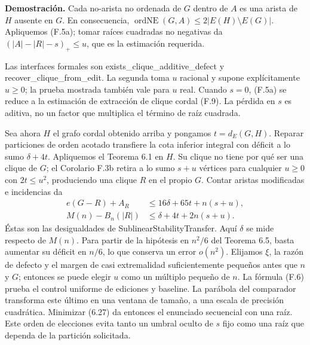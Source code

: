 \documentclass[spanish,11pt,a4paper]{article}
\begin{document}
\textbf{Demostración.} Cada no-arista no ordenada de \(G\) dentro de \(A\) es una arista de \(H\) ausente en \(G\). En consecuencia, \(\operatorname{ordNE}(G,A)\le2|E(H)\setminus E(G)|\). Apliquemos (F.5a); tomar raíces cuadradas no negativas da \((|A|-|R|-s)_+\le u\), que es la estimación requerida.

Las interfaces formales son {\ttfamily\small exists\_\discretionary{\hbox{\ensuremath{\hookrightarrow}}}{}{}clique\_\discretionary{\hbox{\ensuremath{\hookrightarrow}}}{}{}additive\_\discretionary{\hbox{\ensuremath{\hookrightarrow}}}{}{}defect} y {\ttfamily\small recover\_\discretionary{\hbox{\ensuremath{\hookrightarrow}}}{}{}clique\_\discretionary{\hbox{\ensuremath{\hookrightarrow}}}{}{}from\_\discretionary{\hbox{\ensuremath{\hookrightarrow}}}{}{}edit}. La segunda toma \(u\) racional y supone explícitamente \(u\ge0\); la prueba mostrada también vale para \(u\) real. Cuando \(s=0\), (F.5a) se reduce a la estimación de extracción de clique cordal (F.9). La pérdida en \(s\) es aditiva, no un factor que multiplica el término de raíz cuadrada.

Sea ahora \(H\) el grafo cordal obtenido arriba y pongamos \(t=d_E(G,H)\). Reparar particiones de orden acotado transfiere la cota inferior integral con déficit a lo sumo \(\delta+4t\). Apliquemos el Teorema 6.1 en \(H\). Su clique no tiene por qué ser una clique de \(G\); el Corolario F.3b retira a lo sumo \(s+u\) vértices para cualquier \(u\ge0\) con \(2t\le u^2\), produciendo una clique \(R\) en el propio \(G\). Contar aristas modificadas e incidencias da \[
\begin{aligned}
e(G-R)+A_R&\le16\delta+65t+n(s+u),\\
M(n)-B_n(|R|)&\le\delta+4t+2n(s+u).
\end{aligned}
\tag{F.6}
\] Éstas son las desigualdades de SublinearStabilityTransfer. Aquí \(\delta\) se mide respecto de \(M(n)\). Para partir de la hipótesis en \(n^2/6\) del Teorema 6.5, basta aumentar su déficit en \(n/6\), lo que conserva un error \(o(n^2)\). Elijamos \(\xi\), la razón de defecto y el margen de casi extremalidad suficientemente pequeños antes que \(n\) y \(G\); entonces se puede elegir \(u\) como un múltiplo pequeño de \(n\). La fórmula (F.6) prueba el control uniforme de ediciones y baseline. La parábola del comparador transforma este último en una ventana de tamaño, a una escala de precisión cuadrática. Minimizar (6.27) da entonces el enunciado secuencial con una raíz. Este orden de elecciones evita tanto un umbral oculto de \(s\) fijo como una raíz que dependa de la partición solicitada.
\end{document}
